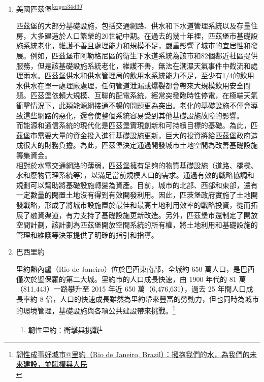\documentclass[a4paper,12pt]{article}
\begin{document}
\begin{enumerate}
\item 美國匹茲堡\textsuperscript{\ref{orgea34d39}}
\label{sec:org72ad771}

匹茲堡的大部分基礎設施，包括交通網路、供水和下水道管理系統以及存量住房，大多建造於人口繁榮的20世紀中期。在過去的幾十年裡，匹茲堡市基礎設施系統老化，維護不善且處理能力和規模不足，嚴重影響了城市的宜居性和發展。例如，匹茲堡市阿勒格尼區的衛生下水道系統為該市和82個鄰近社區提供服務，但是該基礎設施系統老化，維護不善，無法在潮濕天氣事件中截流和處理雨水。匹茲堡供水和供水管理局的飲用水系統能力不足，至少有1/4的飲用水供水在單一處理廠處理，任何管道泄漏或爆裂都會帶來大規模飲用安全問題。匹茲堡依賴大規模、互聯的配電系統，經常突發臨時性停電，在極端天氣衝擊情況下，此類能源網接通不暢的問題更為突出。老化的基礎設施不僅會導致這些網路的惡化，還會使整個系統容易受到其他基礎設施故障的影響。\\

而能源和通信系統的現代化是匹茲堡實現創新和可持續目標的基礎。為此，匹茲堡市需要大量的資金投入進行基礎設施更新，巨大的投資將給匹茲堡政府造成很大的財務負擔。為此，匹茲堡決定通過開發城市土地空間為改善基礎設施籌集資金。\\

相對於水電交通網路的薄弱，匹茲堡擁有足夠的物質基礎設施（道路、橋樑、水和廢物管理系統等），以滿足當前規模人口的需求。通過有效的戰略協調和規劃可以幫助將基礎設施轉變為資產。目前，城市的北部、西部和東部，還有一定數量的閑置土地沒有得到有效開發利用。因此，匹茨堡政府實施了土地開發戰略，形成了將城市設施置於最佳和最高土地利用效率的戰略投資，從而拓展了融資渠道，有力支持了基礎設施更新改造。另外，匹茲堡市還制定了開放空間計劃，該計劃為匹茲堡開放空間系統的所有權，將土地利用和基礎設施的管理和維護等決策提供了明確的指引和指導。\\

\item 巴西里約
\label{sec:orgd2d4e4d}

里約熱內盧（Rio de Janeiro）位於巴西東南部，全城約 650 萬人口，是巴西僅次於聖保羅的第二大城。里約市的人口成長快速，由 1900 年代的 81 萬（811,443）一路攀升至 2015 年近 650 萬（6,476,631），過去 25 年間人口成長率約 8 倍，人口的快速成長雖然為里約帶來豐富的勞動力，但也同時為城市的環境管理，基礎設施與各項公共建設帶來挑戰。\footnote{\href{https://eyesonplace.net/2018/12/12/9554/}{韌性成事好城市@里約（Rio de Janeiro, Brazil）：擁抱我們的水，為我們的未來建設，並賦權與人民}\\\label{orgf42f817}}\\

\begin{enumerate}
\item 韌性里約：衝擊與挑戰\textsuperscript{\ref{orgf42f817}}
\label{sec:org1112511}


\end{enumerate}
\end{enumerate}
\end{document}
